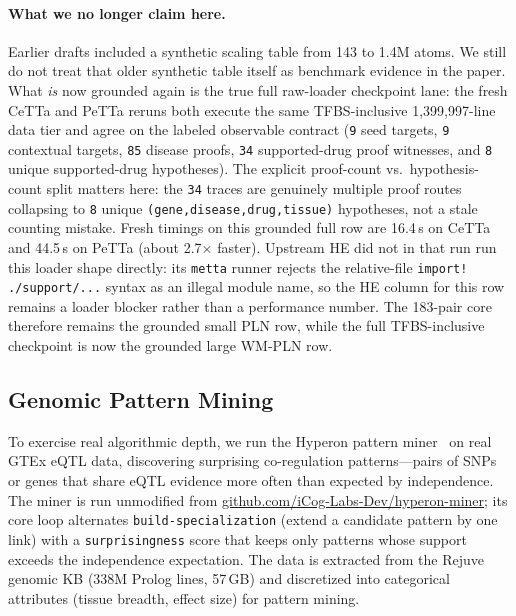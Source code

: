 \documentclass[11pt]{article}
\newcommand{\code}[1]{\texttt{#1}}
\newcommand{\PeTTa}{\textup{PeTTa}}
\newcommand{\HE}{\textup{HE}}
\newcommand{\CeTTa}{\textup{CeTTa}}
\begin{document}
\paragraph{What we no longer claim here.}
Earlier drafts included a synthetic scaling table from 143 to
1.4M atoms.  We still do not treat that older synthetic table itself as
benchmark evidence in the paper.  What \emph{is} now grounded again is
the true full raw-loader checkpoint lane: the fresh \CeTTa{} and
\PeTTa{} reruns both execute the same TFBS-inclusive
1{,}399{,}997-line data tier and agree on the labeled observable
contract
(\code{9} seed targets, \code{9} contextual targets, \code{85}
disease proofs, \code{34} supported-drug proof witnesses, and
\code{8} unique supported-drug hypotheses).  The explicit proof-count
vs.\ hypothesis-count split matters here: the \code{34} traces are
genuinely multiple proof routes collapsing to \code{8} unique
\code{(gene,disease,drug,tissue)} hypotheses, not a stale counting
mistake.  Fresh timings on this grounded full row are 16.4\,s on
\CeTTa{} and 44.5\,s on \PeTTa{} (about 2.7$\times$ faster).  Upstream \HE{} did not in that run
run this loader shape directly: its \code{metta} runner rejects the
relative-file \code{import! ./support/...} syntax as an illegal module
name, so the \HE{} column for this row remains a loader blocker rather
than a performance number.  The 183-pair core therefore remains the
grounded small PLN row, while the full TFBS-inclusive checkpoint is now
the grounded large WM-PLN row.

\subsection{Genomic Pattern Mining}

To exercise real algorithmic depth, we run the Hyperon pattern
miner~\cite{metta} on real GTEx eQTL data, discovering surprising
co-regulation patterns---pairs of SNPs or genes that share eQTL
evidence more often than expected by independence.  The miner is run
unmodified from
\href{https://github.com/iCog-Labs-Dev/hyperon-miner}{github.com/iCog-Labs-Dev/hyperon-miner};
its core loop alternates \code{build-specialization} (extend a candidate
pattern by one link) with a \code{surprisingness} score that keeps only
patterns whose support exceeds the independence expectation.  The data
is extracted from the Rejuve genomic KB (338M Prolog lines, 57\,GB) and
discretized into categorical attributes (tissue breadth, effect size)
for pattern mining.
\end{document}
